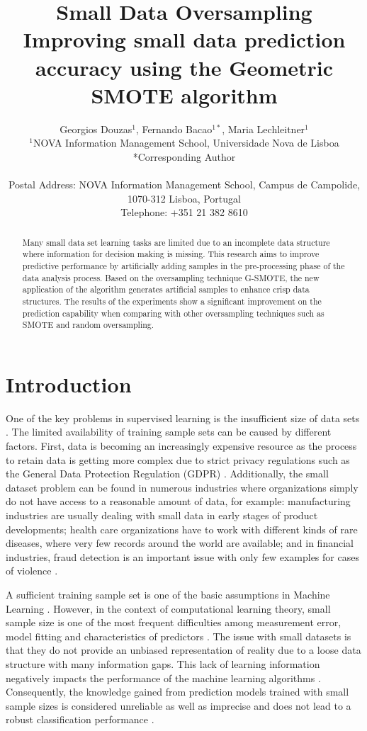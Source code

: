 \documentclass[parskip=full]{scrartcl}
\title{Small Data Oversampling  \\ \LARGE{Improving small data prediction accuracy using the Geometric SMOTE algorithm}}
\author{
	Georgios Douzas\(^{1}\), Fernando Bacao\(^{1*}\), Maria Lechleitner\(^{1}\) 
	\\
	\small{\(^{1}\)NOVA Information Management School, Universidade Nova de Lisboa}
	\\
	\small{*Corresponding Author}
	\\
	\\
	\small{Postal Address: NOVA Information Management School, Campus de Campolide, 1070-312 Lisboa, Portugal}
	\\
	\small{Telephone: +351 21 382 8610}
}
\date{}
\begin{document}
\maketitle

\begin{abstract}
Many small data set learning tasks are limited due to an incomplete data 
structure where information for decision making is missing. This research aims 
to improve predictive performance by artificially adding samples in the 
pre-processing phase of the data analysis process. Based on the oversampling 
technique G-SMOTE, the new application of the algorithm generates artificial 
samples to enhance crisp data structures. The results of the experiments show a 
significant improvement on the prediction capability when comparing with other 
oversampling techniques such as SMOTE and random oversampling. 
\end{abstract}

\section{Introduction}
One of the key problems in supervised learning is the insufficient size of data
sets \cite{Niyogi.1998}. The limited availability of training sample sets can be
caused by different factors. First, data is becoming an increasingly expensive 
resource \cite{Li.2007} as the process to retain data is getting more complex 
due to strict privacy regulations such as the General Data Protection 
Regulation (GDPR) \cite{EuropeanCommission.2019}. Additionally, the small 
dataset problem can be found in numerous industries where organizations simply 
do not have access to a reasonable amount of data, for example: manufacturing 
industries are usually dealing with small data in early stages of product 
developments; health care organizations have to work with different kinds of 
rare diseases, where very few records around the world are available; and in 
financial industries, fraud detection is an important issue with only few 
examples for cases of violence \cite{AbdulLateh.2017}.

A sufficient training sample set is one of the basic assumptions in Machine
Learning \cite{Ivanescu.2006}. However, in the context of computational learning
theory, small sample size is one of the most frequent difficulties among
measurement error, model fitting and characteristics of predictors
\cite{AbdulLateh.2017}. The issue with small datasets is that they do not 
provide an unbiased representation of reality due to a loose data structure 
with many information gaps. This lack of learning information negatively 
impacts the performance of the machine learning algorithms \cite{Lin.2018}. 
Consequently, the knowledge gained from prediction models trained with small 
sample sizes is considered unreliable as well as imprecise and does not lead to 
a robust classification performance \cite{AbdulLateh.2017}.
\end{document}
